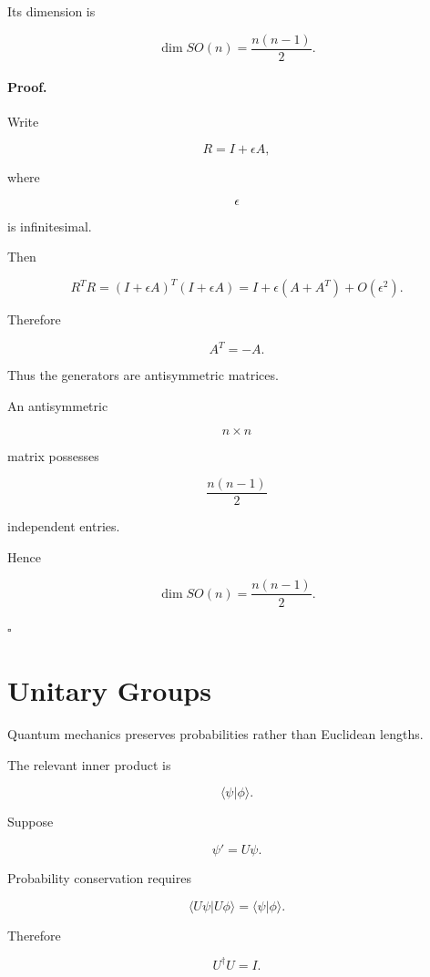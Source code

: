 Its dimension is

\[
\boxed{
\dim SO(n)
=
\frac{n(n-1)}2.
}
\]


\paragraph{Proof.}

Write

\[
R
=
I+\epsilon A,
\]

where

\[
\epsilon
\]

is infinitesimal.

Then

\[
R^TR
=
(I+\epsilon A)^T
(I+\epsilon A)
=
I
+
\epsilon(A+A^T)
+
O(\epsilon^2).
\]

Therefore

\[
A^T=-A.
\]

Thus the generators are antisymmetric matrices.

An antisymmetric

\[
n\times n
\]

matrix possesses

\[
\frac{n(n-1)}2
\]

independent entries.

Hence

\[
\dim SO(n)
=
\frac{n(n-1)}2.
\]

\hfill$\square$

\section{Unitary Groups}

Quantum mechanics preserves probabilities rather than Euclidean lengths.

The relevant inner product is

\[
\langle\psi|\phi\rangle.
\]

Suppose

\[
\psi'
=
U\psi.
\]

Probability conservation requires

\[
\langle
U\psi
|
U\phi
\rangle
=
\langle
\psi
|
\phi
\rangle.
\]

Therefore

\[
U^\dagger U
=
I.
\]


